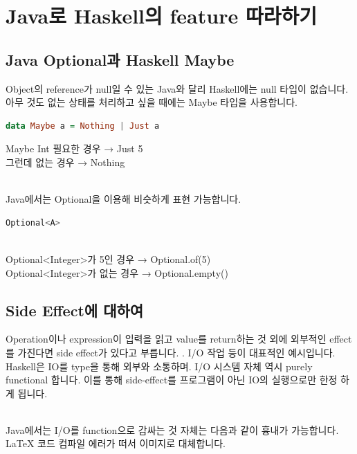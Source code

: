 \documentclass[runningheads]{llncs}
\begin{document}
\section{Java로 Haskell의 feature 따라하기}

\subsection{Java Optional과 Haskell Maybe}

Object의 reference가 null일 수 있는 Java와 달리 Haskell에는 null 타입이 없습니다. 
아무 것도 없는 상태를 처리하고 싶을 때에는 Maybe 타입을 사용합니다. 

\begin{lstlisting}[language=Haskell]
data Maybe a = Nothing | Just a
\end{lstlisting}

\noindent
Maybe Int 필요한 경우 → Just 5 \\
그런데 없는 경우 → Nothing

\noindent
\\
Java에서는 Optional을 이용해 비슷하게 표현 가능합니다.

\begin{lstlisting}[language=Java]
Optional<A>
\end{lstlisting}

\noindent
\\
Optional<Integer>가 5인 경우 → Optional.of(5) \\
Optional<Integer>가 없는 경우 → Optional.empty()


\subsection{Side Effect에 대하여}

Operation이나 expression이 입력을 읽고 value를 return하는 것 외에 외부적인 effect를 가진다면 side effect가 있다고 부릅니다. \cite{ref_wiki_side_effect_free}.
I/O 작업 등이 대표적인 예시입니다. Haskell은 IO를 type을 통해 외부와 소통하며. I/O 시스템 자체 역시 purely functional 합니다\cite{ref_haskell_io}. 이를 통해 side-effect를 프로그램이 아닌 IO의 실행으로만 한정 하게 됩니다.

\noindent
\\
Java에서는 I/O를 function으로 감싸는 것 자체는 다음과 같이 흉내가 가능합니다. LaTeX 코드 컴파일 에러가 떠서 이미지로 대체합니다.
\end{document}
